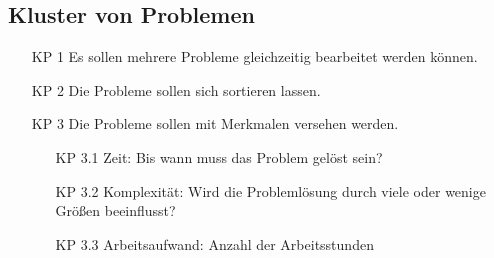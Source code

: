 \subsection*{Kluster von Problemen}
\begin{itemize}
\item[KP 1] Es sollen mehrere Probleme gleichzeitig bearbeitet werden können.
\item[KP 2] Die Probleme sollen sich sortieren lassen.
\item[KP 3] Die Probleme sollen mit Merkmalen versehen werden.
	\begin{itemize}
	\item[KP 3.1] Zeit: Bis wann muss das Problem gelöst sein?
	\item[KP 3.2] Komplexität: Wird die Problemlösung durch viele oder wenige Größen beeinflusst?
	\item[KP 3.3] Arbeitsaufwand: Anzahl der Arbeitsstunden
	\end{itemize}
\end{itemize}

